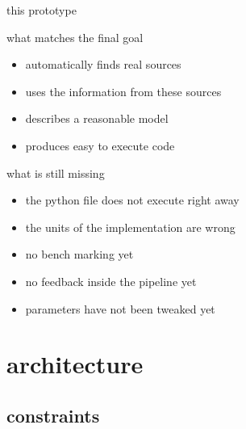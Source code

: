\documentclass[t]{beamer}
\numberwithin{equation}{section}
\begin{document}
	\begin{frame}[c]{this prototype}
		\bigskip
		\begin{minipage}{0.48 \linewidth}
			\centering
			\begin{exampleblock}{what matches the final goal}
				\begin{itemize}
					\item automatically finds real sources
					\item uses the information from these sources
					\item describes a reasonable model
					\item produces easy to execute code
				\end{itemize}
			\end{exampleblock}
		\end{minipage}
		\hfill%
		\pause
		\begin{minipage}{0.48 \linewidth}
			\centering
			\begin{alertblock}{what is still missing}
				\begin{itemize}
					\item the python file does not execute right away
					\item the units of the implementation are wrong
					\item no bench marking yet
					\item no feedback inside the pipeline yet
					\item parameters have not been tweaked yet
				\end{itemize}
			\end{alertblock}
		\end{minipage}
	\end{frame}
	
	
	\section{architecture}
	
	\subsection{constraints}
	
\end{document}
